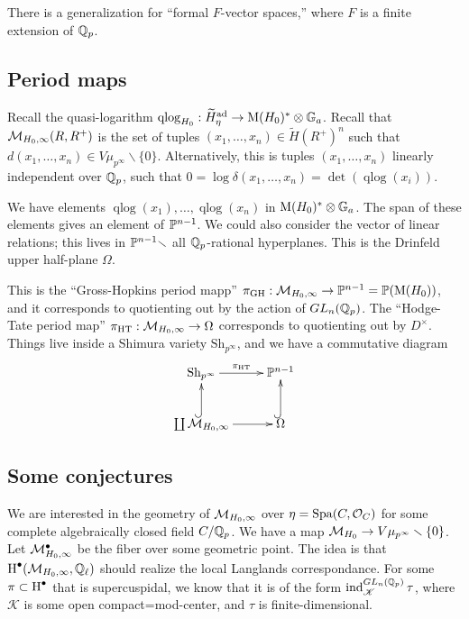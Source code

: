 There is a generalization for ``formal $F$-vector spaces,'' where 
$F$ is a finite extension of $\mathbb{Q}_p$. 





\subsection{Period maps}

Recall the quasi-logarithm $\operatorname{qlog}_{H_0}:\widetilde H_\eta^{\textnormal{ad}} \to \operatorname M(H_0)^\ast\otimes \mathbb{G}_a$. Recall that 
$\mathcal{M}_{H_0,\infty}(R,R^+)$ is the set of tuples 
$(x_1,\dots,x_n)\in \widetilde H(R^+)^n$ such that 
$d(x_1,\dots,x_n)\in V\mu_{p^\infty}\smallsetminus \{0\}$. Alternatively, this is 
tuples $(x_1,\dots,x_n)$ linearly independent over $\mathbb{Q}_p$, such that 
$0=\log \delta(x_1,\dots,x_n)=\det(\operatorname{qlog}(x_i))$. 

We have elements $\operatorname{qlog}(x_1),\dots,\operatorname{qlog}(x_n)$ in 
$\operatorname{M}(H_0)^\ast\otimes \mathbb{G}_a$. The span of these elements gives an 
element of $\mathbb{P}^{n-1}$. We could also consider the vector of linear relations; this 
lives in $\mathbb{P}^{n-1}\smallsetminus$ all $\mathbb{Q}_p$-rational hyperplanes. This 
is the Drinfeld upper half-plane $\Omega$. 

This is the ``Gross-Hopkins period mapp'' 
$\pi_\text{GH}:\mathcal{M}_{H_0,\infty} \to \mathbb{P}^{n-1} = \mathbb{P}(\operatorname M(H_0))$, and 
it corresponds to quotienting out by the action of $GL_n(\mathbb{Q}_p)$. 
The ``Hodge-Tate period map'' $\pi_\text{HT}:\mathcal{M}_{H_0,\infty}\to \Omega$ corresponds 
to quotienting out by $D^\times$. Things live inside a Shimura variety 
$\text{Sh}_{p^\infty}$, and we have a commutative diagram 
\[\xymatrix{
  \mbox{Sh}_{p^\infty} \ar[r]^-{\pi_\text{HT}} 
    & \dP^{n-1} \\
  \coprod \cM_{H_0,\infty} \ar[r] \ar@{^{(}->}[u] 
    & \Omega\ar@{^{(}->}[u] 
}\]





\subsection{Some conjectures}

We are interested in the geometry of $\mathcal{M}_{H_0,\infty}$ over 
$\eta=\operatorname{Spa}(C,\mathcal{O}_C)$ for some complete algebraically closed field $C/\mathbb{Q}_p$. 
We have a map $\mathcal{M}_{H_0} \to V\mu_{p^\infty} \smallsetminus \{0\}$. Let 
$\mathcal{M}_{H_0,\infty}^\bullet$ be the fiber over some geometric point. The idea is that 
$\operatorname{H}^\bullet(\mathcal{M}_{H_0,\infty},\mathbb{Q}_\ell)$ should realize the local Langlands correspondance. 
For some $\pi\subset \operatorname{H}^\bullet$ that is supercuspidal, we know that it is of the form 
$\operatorname{ind}_{\mathscr K}^{GL_n(\mathbb{Q}_p)} \tau$, where 
$\mathscr K$ is some open compact=mod-center, and $\tau$ is finite-dimensional. 

